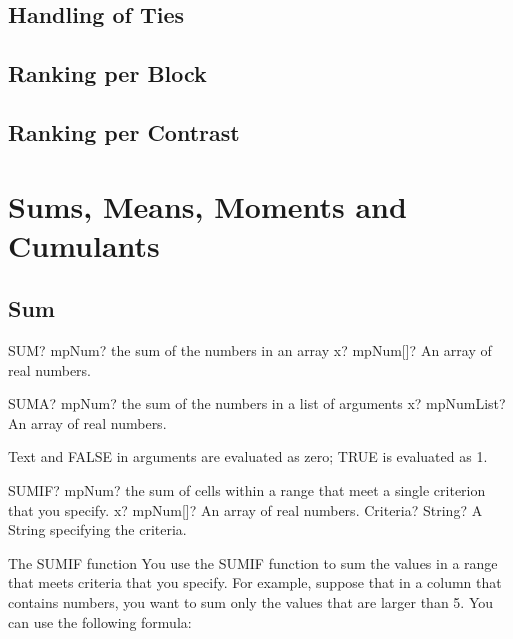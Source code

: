 \subsection{Handling of Ties}
\lipsum[2]


\subsection{Ranking per Block}
\lipsum[2]


\subsection{Ranking per Contrast}
\lipsum[2]



\newpage
\section{Sums, Means, Moments and Cumulants}
\label{MomentsAndCumulants}

\subsection{Sum}

\begin{mpFunctionsExtract}
	\mpWorksheetFunctionOneNotImplemented
	{SUM? mpNum? the sum of the numbers in an array}
	{x? mpNum[]? An array of real numbers.}
\end{mpFunctionsExtract}


\vspace{0.6cm}
\begin{mpFunctionsExtract}
	\mpWorksheetFunctionOneNotImplemented
	{SUMA? mpNum? the sum of the numbers in a list of arguments}
	{x? mpNumList? An array of real numbers.}
\end{mpFunctionsExtract}

\vspace{0.3cm}
Text and FALSE in arguments are evaluated as zero; TRUE is evaluated as 1.


\vspace{0.6cm}
\begin{mpFunctionsExtract}
	\mpWorksheetFunctionTwoNotImplemented
	{SUMIF? mpNum? the sum of cells within a range that meet a single criterion that you specify.}
	{x? mpNum[]? An array of real numbers.}
	{Criteria? String? A String specifying the criteria.}
\end{mpFunctionsExtract}

\vspace{0.3cm}
The \textsf{SUMIF} function   You use the SUMIF function to sum the values in a range  that meets criteria that you specify. For example, suppose that in a column that contains numbers, you want to sum only the values that are larger than 5. You can use the following formula:

